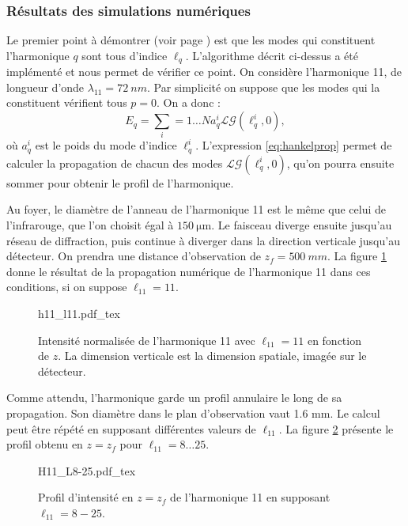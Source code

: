 \subsubsection{Résultats des simulations numériques}
Le premier point à démontrer (voir page \pageref{enum:properties}) est que les modes qui constituent l'harmonique $q$ sont tous d'indice $\ell_q$. L'algorithme décrit ci-dessus a été implémenté et nous permet de vérifier ce point. On considère l'harmonique 11, de longueur d'onde $\lambda_{11}=\SI{72}{nm}$. Par simplicité on suppose que les modes qui la constituent vérifient tous $p=0$. On a donc :
\begin{equation}
E_{q} = \sum_i={1\ldots N} a_q^i \mathcal{LG}(\ell_q^i,0),
\end{equation}
où $a_q^i$ est le poids du mode d'indice $\ell_q^i$. L'expression \ref{eq:hankelprop} permet de calculer la propagation de chacun des modes $\mathcal{LG}(\ell_q^i,0)$, qu'on pourra ensuite sommer pour obtenir le profil de l'harmonique. \par
Au foyer, le diamètre de l'anneau de l'harmonique 11 est le même que celui de l'infrarouge, que l'on choisit égal à $\SI{150}{\micro\m}$. Le faisceau diverge ensuite jusqu'au réseau de diffraction, puis continue à diverger dans la direction verticale jusqu'au détecteur. On prendra une distance d'observation de $z_f=\SI{500}{mm}$. La figure \ref{fig:H11_L11} donne le résultat de la propagation numérique de l'harmonique 11 dans ces conditions, si on suppose $\ell_{11}=11$.
\begin{figure}[!ht]
\centering
\def\svgwidth{.5\columnwidth}
{h11_l11.pdf_tex}
\caption{Intensité normalisée de l'harmonique 11 avec $\ell_{11} = 11$ en fonction de $z$. La dimension verticale est la dimension spatiale, imagée sur le détecteur.}
\label{fig:H11_L11}
\end{figure}
Comme attendu, l'harmonique garde un profil annulaire le long de sa propagation. Son diamètre dans le plan d'observation vaut 1.6 mm. Le calcul peut être répété en supposant différentes valeurs de $\ell_{11}$. La figure \ref{Fig:H11_L8-25} présente le profil obtenu en $z=z_f$ pour $\ell_{11}=8\ldots 25$.

\begin{figure}[!ht]
\centering
\def\svgwidth{.7\columnwidth}
{H11_L8-25.pdf_tex}
\caption{Profil d'intensité en $z=z_f$ de l'harmonique 11 en supposant $\ell_{11} = 8-25$.}
\label{Fig:H11_L8-25}
\end{figure}

